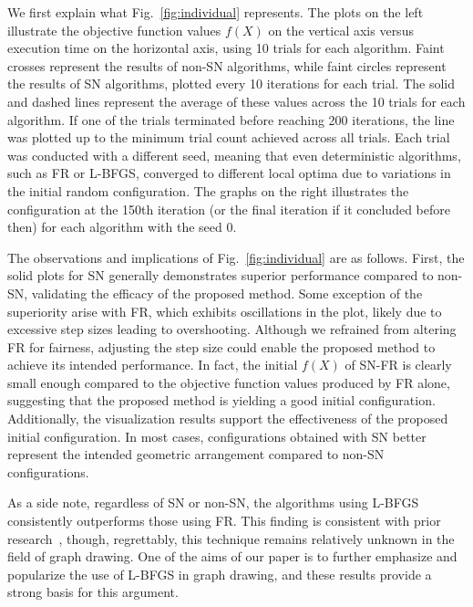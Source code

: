 \documentclass[dvipdfmx,journal]{IEEEtran}
\begin{document}
We first explain what Fig.~\ref{fig:individual} represents.
The plots on the left illustrate the objective function values $f(X)$ on the vertical axis versus execution time on the horizontal axis, using 10 trials for each algorithm.
Faint crosses represent the results of non-\textsf{SN} algorithms, while faint circles represent the results of \textsf{SN} algorithms, plotted every 10 iterations for each trial.
The solid and dashed lines represent the average of these values across the 10 trials for each algorithm.
If one of the trials terminated before reaching 200 iterations, the line was plotted up to the minimum trial count achieved across all trials.
Each trial was conducted with a different seed, meaning that even deterministic algorithms, such as
\textsf{FR} or \textsf{L-BFGS}, converged to different local optima due to variations in the initial random configuration.
The graphs on the right illustrates the configuration at the 150th iteration (or the final iteration if it concluded before then) for each algorithm with the seed 0.

The observations and implications of Fig.~\ref{fig:individual} are as follows.
First, the solid plots for \textsf{SN} generally demonstrates superior performance compared to non-\textsf{SN}, validating the efficacy of the proposed method.
Some exception of the superiority arise with \textsf{FR}, which exhibits oscillations in the plot, likely due to excessive step sizes leading to overshooting.
Although we refrained from altering \textsf{FR} for fairness, adjusting the step size could enable the proposed method to achieve its intended performance.
In fact, the initial $f(X)$ of \textsf{SN-FR} is clearly small enough compared to the objective function values produced by \textsf{FR} alone, suggesting that the proposed method is yielding a good initial configuration.
Additionally, the visualization results support the effectiveness of the proposed initial configuration. In most cases, configurations obtained with \textsf{SN} better represent the intended geometric arrangement compared to non-\textsf{SN} configurations.

As a side note, regardless of \textsf{SN} or non-\textsf{SN}, the algorithms using \textsf{L-BFGS} consistently outperforms those using \textsf{FR}.
This finding is consistent with prior research~\cite{6183577}, though, regrettably, this technique remains relatively unknown in the field of graph drawing.
One of the aims of our paper is to further emphasize and popularize the use of \textsf{L-BFGS} in graph drawing, and these results provide a strong basis for this argument.
\end{document}
